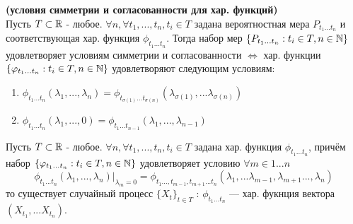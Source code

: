 \begin{theorem}
    \textbf{(условия симметрии и согласованности для хар. функций)} \\
    Пусть $T \subset \mathbb{R}$ - любое.  $ \forall n, \forall t_1, ...,  t_n, t_i \in T $ задана вероятностная мера $P_{t_1...t_n}$ и соответствующая хар. функция $\phi_{t_1...t_n}$. Тогда набор мер  $\{P_{t_1...t_n}: t_i \in T, n\in \mathbb{N}\}$ удовлетворяет условиям симметрии и согласованности $\Longleftrightarrow$ хар. функции  $\{\varphi_{t_1...t_n}: t_i \in T, n\in \mathbb{N}\}$ удовлетворяют следующим
условиям: \begin{enumerate}
    \item $\phi_{t_1...t_n}(\lambda_1, ..., \lambda_n) = \phi_{t_{\sigma(1)}...t_{\sigma(n)}}(\lambda_{\sigma(1)} , ... \lambda_{\sigma(n)})$ 
    \item $\phi_{t_1...t_n}(\lambda_1, ..., 0) = \phi_{t_1...t_{n-1}}(\lambda_1, ..., \lambda_{n-1})$
\end{enumerate}
\end{theorem}
\begin{corollary}\label{3.6.1}
Пусть $T \subset \mathbb{R}$ - любое.  $ \forall n, \forall t_1, ...,  t_n, t_i \in T $ задана хар. функция $\phi_{t_1...t_n}$, причём набор $\{\varphi_{t_1...t_n}: t_i \in T, n\in \mathbb{N}\}$
удовлетворяет условию $\forall m \in 1...n$
$$\phi_{t_1...t_n}(\lambda_1, ..., \lambda_n)|_{\lambda_m = 0} = \phi_{t_1..., t_{m-1}, t_{m+1}...t_n}(\lambda_1, ...\lambda_{m-1},\lambda_{m+1} ..., \lambda_n)$$
то существует случайный процесс $\{X_t\}_{t \in T}$ : $\phi_{t_1...t_n}$ — хар. фукнция вектора $(X_{t_1}, ... X_{t_n})$.
\end{corollary}

